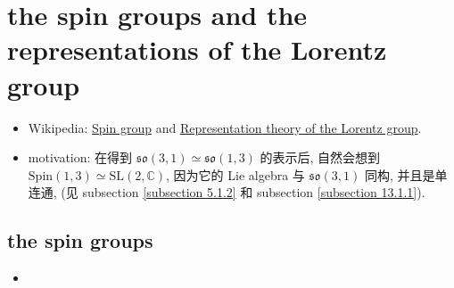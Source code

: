 \chapter{the spin groups and the representations of the Lorentz group}
\begin{itemize}
	\item Wikipedia: \href{https://en.wikipedia.org/wiki/Spin_group}{Spin group} and \href{https://en.wikipedia.org/wiki/Representation_theory_of_the_Lorentz_group}{Representation theory of the Lorentz group}.
	
	\item motivation: 在得到 $\mathfrak{so}(3, 1) \simeq \mathfrak{so}(1, 3)$ 的表示后, 自然会想到 $\mathrm{Spin}(1, 3) \simeq \mathrm{SL}(2, \mathbb{C})$, 因为它的 Lie algebra 与 $\mathfrak{so}(3, 1)$ 同构, 并且是单连通, (见 subsection \ref{subsection 5.1.2} 和 subsection \ref{subsection 13.1.1}).
\end{itemize}

\section{the spin groups}
\begin{itemize}
	\item 
\end{itemize}

